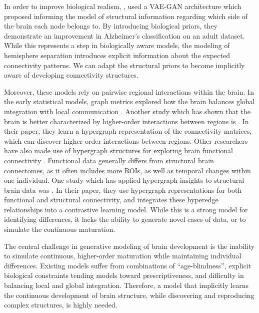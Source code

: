 \documentclass[sigconf, review]{acmart}
\begin{document}
In order to improve biological realism, \citet{zuo_hemisphere-separated_2023}, used a VAE-GAN architecture which proposed informing the model of structural information regarding which side of the brain each node belongs to. By introducing biological priors, they demonstrate an improvement in Alzheimer's classification on an adult dataset. While this represents a step in biologically aware models, the modeling of hemisphere separation introduces explicit information about the expected connectivity patterns. We can adapt the structural priors to become implicitly aware of developing connectivity structures.  

Moreover, \cite{zuo_hemisphere-separated_2023} these models rely on pairwise regional interactions within the brain. In the early statistical models, graph metrics explored how the brain balances global integration with local communication \cite{sporns_human_2013}. Another study which has shown that the brain is better characterized by higher-order interactions between regions is \citet{xiao_multi-hypergraph_2020}. In their paper, they learn a hypergraph representation of the connectivity matrices, which can discover higher-order interactions between regions. Other researchers have also made use of hypergraph structures for exploring brain functional connectivity \cite{yuan_d-hypernet_2025, sadeghian_hyperbrain_2025, han_hypergraph_2025, han_hypergraph-based_2026}. Functional data generally differs from structural brain connectomes, as it often includes more ROIs, as well as temporal changes within one individual. One study which has applied hypergraph insights to structural brain data was \citet{yuan_d-hypernet_2025}. In their paper, they use hypergraph representations for both functional and structural connectivity, and integrates these hyperedge relationships into a contrastive learning model. While this is a strong model for identifying differences, it lacks the ability to generate novel cases of data, or to simulate the continuous maturation.

The central challenge in generative modeling of brain development is the inability to simulate continuous, higher-order maturation while maintaining individual differences. Existing models suffer from combinations of ``age-blindness'', explicit biological constraints tending models toward prescriptiveness, and difficulty in balancing local and global integration. Therefore, a model that implicitly learns the continuous development of brain structure, while discovering and reproducing complex structures, is highly needed. 
\end{document}
